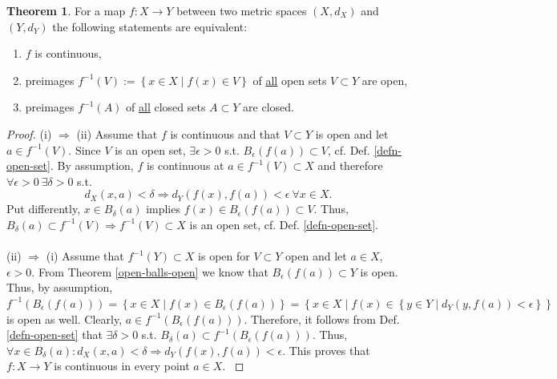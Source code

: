 \documentclass[12pt, a4paper]{article}
\numberwithin{equation}{section}
\theoremstyle{definition}
\theoremstyle{definition}
\newtheorem{theorem}[thm]{Theorem}
\begin{document}
	\begin{theorem}\label{defn:preimages_continuous_functions}
		For a map $f: X\rightarrow Y$ between two metric spaces $\left(X, d_{X} \right)$ and $\left(Y, d_{Y} \right)$ the following statements are equivalent: 
		\begin{enumerate}[label = (\roman*)]
			\item $f$ is continuous,
			\item preimages $f^{-1}(V) := \left\{ x\in X\mid f\left(x\right) \in V \right\}$ of \underline{all} open sets $V\subset Y$ are open,  
			\item preimages $f^{-1}(A)$ of \underline{all} closed sets $A\subset Y$ are closed. 	
		\end{enumerate}
	\end{theorem}
 
	\begin{proof}
		(i) $\Rightarrow$ (ii) Assume that $f$ is continuous and that $V\subset Y$ is open and let $a\in f^{-1}\left( V\right)$. Since $V$ is an open set, $\exists \epsilon > 0$ s.t. $B_{\epsilon}\left( f\left(a\right) \right)\subset V$, cf. Def. \ref{defn-open-set}. By assumption, $f$ is continuous at $a\in f^{-1}\left(V\right)\subset X$ and therefore $\forall \epsilon > 0 \ \exists \delta > 0$ s.t. 
		$$d_{X}\left(x, a\right) < \delta\Rightarrow d_{Y}\left(f\left(x\right), f\left(a\right)\right) < \epsilon \ \forall x\in X.$$ 
		Put differently, $x\in B_{\delta}\left( a\right)$ implies $f\left(x\right) \in B_{\epsilon}\left( f\left(a\right) \right) \subset V$. Thus, $B_{\delta}(a) \subset f^{-1}(V) \Rightarrow f^{-1}(V) \subset X$ is an open set, cf. Def. \ref{defn-open-set}. 
		\\ 
		\\ 
		(ii) $\Rightarrow$ (i) Assume that $f^{-1}\left(Y\right) \subset X$ is open for $V\subset Y$ open and let $a\in X$, $\epsilon > 0$. From Theorem \ref{open-balls-open} we know that $B_{\epsilon}\left(f\left(a\right)\right)\subset Y$ is open. Thus, by assumption, $f^{-1}\left( B_{\epsilon}\left( f\left(a\right) \right) \right) = \left\{ x\in X \mid f\left( x \right) \in B_{\epsilon}\left( f\left(a\right) \right) \right\} = \left\{ x\in X \mid f\left(x\right) \in \left\{ y\in Y\mid d_Y\left( y, f\left(a\right) \right) < \epsilon \right\}\right\}$ is open as well. Clearly, $a\in f^{-1}\left( B_{\epsilon}\left( f\left(a\right) \right) \right)$. Therefore, it follows from Def. \ref{defn-open-set} that $\exists\delta > 0$ s.t. $B_{\delta}(a) \subset f^{-1}\left( B_{\epsilon}\left( f\left(a\right) \right) \right)$. Thus, $\forall x\in B_{\delta}(a): d_{X}\left( x, a \right) < \delta \Rightarrow d_Y\left(f\left(x\right), f\left(a\right)\right) < \epsilon$. This proves that $f: X\rightarrow Y$ is continuous in every point $a\in X$. \cite{cont-functions-open-sets}   

\end{proof}
\end{document}
